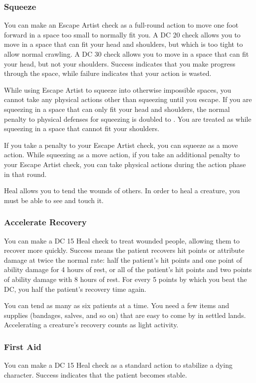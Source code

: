 \subsubsection{Squeeze}
You can make an Escape Artist check as a full-round action to move one foot forward in a space too small to normally fit you. A DC 20 check allows you to move in a space that can fit your head and shoulders, but which is too tight to allow normal crawling. A DC 30 check allows you to move in a space that can fit your head, but not your shoulders. Success indicates that you make progress through the space, while failure indicates that your action is wasted.

While using Escape Artist to squeeze into otherwise impossible spaces, you cannot take any physical actions other than squeezing until you escape. If you are squeezing in a space that can only fit your head and shoulders, the normal penalty to physical defenses for squeezing is doubled to . You are treated as \helpless while squeezing in a space that cannot fit your shoulders.

If you take a  penalty to your Escape Artist check, you can squeeze as a move action. While squeezing as a move action, if you take an additional  penalty to your Escape Artist check, you can take physical actions during the action phase in that round.

Heal allows you to tend the wounds of others. In order to heal a creature, you must be able to see and touch it.

\subsubsection{Accelerate Recovery}\label{Accelerate Recovery}
You can make a DC 15 Heal check to treat wounded people, allowing them to recover more quickly. Success means the patient recovers hit points or attribute damage at twice the normal rate: half the patient's hit points and one point of ability damage for 4 hours of rest, or all of the patient's hit points and two points of ability damage with 8 hours of rest. For every 5 points by which you beat the DC, you half the patient's recovery time again.

You can tend as many as six patients at a time. You need a few items and supplies (bandages, salves, and so on) that are easy to come by in settled lands. Accelerating a creature's recovery counts as light activity. %

\subsubsection{First Aid}
You can make a DC 15 Heal check as a standard action to stabilize a dying character. Success indicates that the patient becomes stable.

